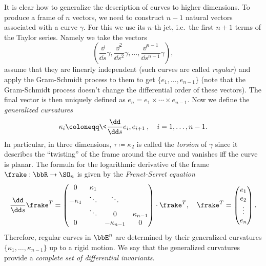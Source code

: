\begin{example}\label{ex serret-frenet}
    It is clear how to generalize the description of curves to higher dimensions. To produce a frame of $n$ vectors, we need to construct $n-1$ natural vectors associated with a curve $\gamma$. For this we use its $n$-th jet, i.e.\ the first $n+1$ terms of the Taylor series. Namely we take the vectors 
    \[\left(\frac{\dd}{\dd s}\gamma,\frac{\dd^2}{\dd s^2}\gamma,\ldots,\frac{\dd^{n-1}}{\dd s^{n-1}}\gamma\right),\] assume that they are linearly independent (such curves are called \emph{regular}) and apply the Gram-Schmidt process to them to get $\{e_1,\ldots,e_{n-1}\}$ (note that the Gram-Schmidt process doesn't change the differential order of these vectors). The final vector is then uniquely defined as $e_n=e_1\times\cdots\times e_{n-1}$. Now we define the \emph{generalized curvatures}
    \[\kappa_i\coloneqq \<\frac{\dd}{\dd s}e_i,e_{i+1}\>,\quad i=1,\ldots,n-1.\] 
    In particular, in three dimensions, $\tau\coloneqq \kappa_2$ is called the \emph{torsion} of $\gamma$ since it describes the ``twisting'' of the frame around the curve and vanishes iff the curve is planar. The formula for the logarithmic derivative of the frame $\frake:\bbR\to \SO_n$ is given by the \emph{Frenet-Serret equation}
    \[\frac{\dd}{\dd s}\frake^T=\begin{pmatrix}
        0 & \kappa_1 & &\\
        -\kappa_1 &\ddots & \ddots&\\
         & \ddots &0 &\kappa_{n-1}\\
         0 & &-\kappa_{n-1} & 0
    \end{pmatrix}\cdot \frake^T,\quad 
    \frake^T=\begin{pmatrix}
        e_1 \\e_2 \\ \vdots \\ e_n
    \end{pmatrix}.
    \]
    Therefore, regular curves in $\bbE^n$ are determined by their generalized curvatures $\{\kappa_1,\ldots,\kappa_{n-1}\}$ up to a rigid motion. We say that the generalized curvatures provide a \emph{complete set of differential invariants}.
\end{example}

